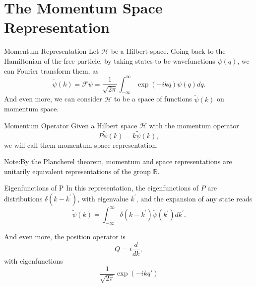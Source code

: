 \documentclass[12pt]{beamer}
\begin{document}
\section[The Momentum Space Representation]{The Momentum Space Representation}
\begin{frame}{Momentum Representation}
Let $\mathcal{H}$ be a Hilbert space. Going back to the Hamiltonian of the free particle, by taking states to be wavefunctions $\psi(q)$, we can Fourier transform them, as
\begin{displaymath}
  \tilde\psi(k) = \mathcal{F}\psi = \frac{1}{\sqrt{2\pi}}\int_{-\infty}^{\infty}\exp(-ikq)\psi(q)dq.
\end{displaymath}
And even more, we can consider $\mathcal{H}$ to be a space of functions $\tilde\psi(k)$ on momentum space.
\end{frame}
\begin{frame}{Momentum Operator}
Given a Hilbert space $\mathcal{H}$ with the momentum operator
\begin{displaymath}
  P\tilde\psi(k)=k\tilde\psi(k),
\end{displaymath}
we will call them momentum space representation.

Note:By the Plancherel theorem, momentum and space representations are unitarily equivalent representations of the group $\mathbb{R}$.
\end{frame}
\begin{frame}{Eigenfunctions of P}
In this representation, the eigenfunctions of $P$ are distributions $\delta(k-k^{\prime})$, with eigenvalue $k^{\prime}$, and the expansion of any state reads
\begin{displaymath}
  \tilde\psi(k)=\int_{-\infty}^{\infty}\delta(k-k^{\prime})\tilde\psi(k^{\prime})dk^{\prime}.
\end{displaymath}

And even more, the position operator is
\begin{displaymath}
  Q=i\frac{d}{dk},
\end{displaymath}
with eigenfunctions 
\begin{displaymath}
  \frac{1}{\sqrt{2\pi}}\exp(-ikq{\prime})
\end{displaymath}
\end{frame}
\end{document}
